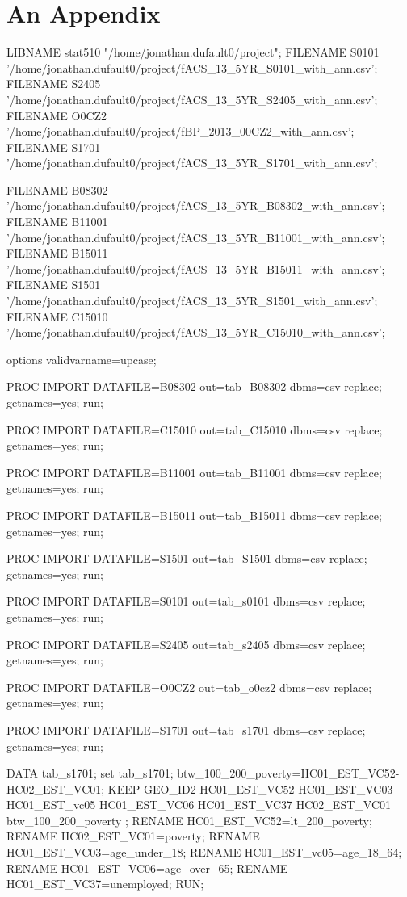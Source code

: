 \chapter{An Appendix}
\begin{SAScode}
LIBNAME stat510 "/home/jonathan.dufault0/project";
FILENAME S0101 '/home/jonathan.dufault0/project/fACS_13_5YR_S0101_with_ann.csv';
FILENAME S2405 '/home/jonathan.dufault0/project/fACS_13_5YR_S2405_with_ann.csv';
FILENAME O0CZ2 '/home/jonathan.dufault0/project/fBP_2013_00CZ2_with_ann.csv';
FILENAME S1701 '/home/jonathan.dufault0/project/fACS_13_5YR_S1701_with_ann.csv';

FILENAME B08302 '/home/jonathan.dufault0/project/fACS_13_5YR_B08302_with_ann.csv';
FILENAME B11001 '/home/jonathan.dufault0/project/fACS_13_5YR_B11001_with_ann.csv';
FILENAME B15011 '/home/jonathan.dufault0/project/fACS_13_5YR_B15011_with_ann.csv';
FILENAME S1501 '/home/jonathan.dufault0/project/fACS_13_5YR_S1501_with_ann.csv';
FILENAME C15010 '/home/jonathan.dufault0/project/fACS_13_5YR_C15010_with_ann.csv';

options validvarname=upcase; 

PROC IMPORT DATAFILE=B08302
     out=tab_B08302
     dbms=csv
     replace;
     getnames=yes;
run;

PROC IMPORT DATAFILE=C15010
     out=tab_C15010
     dbms=csv
     replace;
     getnames=yes;
run;

PROC IMPORT DATAFILE=B11001
     out=tab_B11001
     dbms=csv
     replace;
     getnames=yes;
run;

PROC IMPORT DATAFILE=B15011
     out=tab_B15011
     dbms=csv
     replace;
     getnames=yes;
run;

PROC IMPORT DATAFILE=S1501
     out=tab_S1501
     dbms=csv
     replace;
     getnames=yes;
run;








PROC IMPORT DATAFILE=S0101
     out=tab_s0101
     dbms=csv
     replace;
     getnames=yes;
run;

PROC IMPORT DATAFILE=S2405
     out=tab_s2405
     dbms=csv
     replace;
     getnames=yes;
run;

PROC IMPORT DATAFILE=O0CZ2
     out=tab_o0cz2
     dbms=csv
     replace;
     getnames=yes;
run;


PROC IMPORT DATAFILE=S1701
     out=tab_s1701
     dbms=csv
     replace;
     getnames=yes;
run;


DATA tab_s1701;
set tab_s1701;
btw_100_200_poverty=HC01_EST_VC52-HC02_EST_VC01;
KEEP GEO_ID2
HC01_EST_VC52
HC01_EST_VC03
HC01_EST_vc05
HC01_EST_VC06
HC01_EST_VC37
HC02_EST_VC01
btw_100_200_poverty
;
RENAME HC01_EST_VC52=lt_200_poverty;
RENAME HC02_EST_VC01=poverty;
RENAME HC01_EST_VC03=age_under_18;
RENAME HC01_EST_vc05=age_18_64;
RENAME HC01_EST_VC06=age_over_65;
RENAME HC01_EST_VC37=unemployed;
RUN;


\end{SAScode}
